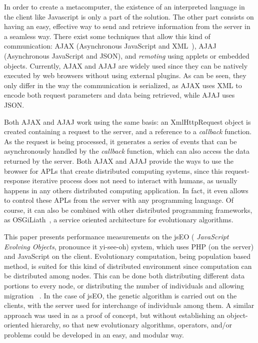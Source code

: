 \documentclass[runningheads,a4paper]{llncs}
\begin{document}
In order to create a metacomputer, the existence of an interpreted language in the client like Javascript is only a part of the solution. The other part consists on having an easy, effective way to send and retrieve information from the server in a seamless way. There exist some techniques that allow this kind of communication: AJAX (Asynchronous JavaScript and
XML~\cite{brinzarea2010ajax}), AJAJ (Asynchronous JavaScript and JSON), and {\em remoting} using
applets or embedded objects. Currently, AJAX and AJAJ are widely used since they can be natively executed by web browsers without using external plugins. As can be seen, they only differ in the way the communication is serialized, as AJAX uses XML\cite{goldberg2009xml} to encode both request parameters and data being retrieved, while AJAJ uses JSON. 

Both AJAX and AJAJ work using the same basis: an {\sf XmlHttpRequest} object is created  containing a request to the server, and a reference to a {\em callback} function. 
As the request is being processed, it generates a series of events that can be asynchronously handled by the {\em callback} function, which can also access the data returned by the server.
Both AJAX and AJAJ provide the ways to use the browser for APLs that create distributed computing systems, since this request-response iterative process does not need to interact with humans, as usually happens in any others distributed computing application.
In fact, it even allows to control these APLs from the server with any programming
language. Of course, it can also be combined with other distributed
programming frameworks, as OSGiLiath~\cite{DBLP:journals/soco/Garcia-SanchezGCAG13}, a service oriented architecture for evolutionary algorithms.


This paper presents performance measurements on the jsEO ({\em
  JavaScript Evolving Objects}, pronounce it yi-see-oh) system, which uses PHP 
 (on the server) and JavaScript on the client. Evolutionary computation, being population based method, is suited for this
kind of distributed environment since computation can be distributed among nodes. This can be done both distributing different data portions to every node, or distributing the number of individuals and allowing migration ~\cite{cantu-paz:migration-policies}. In the case of jsEO, the genetic algorithm is carried out  on the clients,
with the server used  for interchange of individuals among
them. A similar approach was used in \cite{agajaj} as a proof of concept, but without establishing an object-oriented hierarchy, so that new evolutionary algorithms, operators, and/or problems could be developed in an easy, and modular way.
\end{document}
